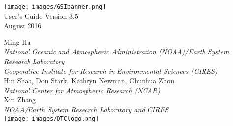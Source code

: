 \begin{titlepage}
{}
\noindent
   \begin{center}     

      \texttt{[image: images/GSIbanner.png]}\\[2em]
     {\color{darkcerulean}
        \Huge{User's Guide Version 3.5 }\\[1em]       
        \normalsize{August 2016}\\[5em] 
       }
 
      \normalsize{Ming Hu}\\ 
      \textit{\small{National Oceanic and Atmospheric Administration (NOAA)/Earth System Research Laboratory}}\\
      \textit{\small{Cooperative Institute for Research in Environmental Sciences (CIRES)}}\\[2em]
      \normalsize{Hui Shao, Don Stark, Kathryn Newman, Chunhua Zhou}\\
      \textit{\small{National Center for Atmospheric Research (NCAR)}}\\[2em]
      \normalsize{Xin Zhang}\\
      \textit{\small{NOAA/Earth System Research Laboratory and CIRES}}\\[4em]
    
       \texttt{[image: images/DTClogo.png]}\\
         
      \vspace{1em}

   \end{center}
   \restoregeometry
\end{titlepage}
\pagebreak{}




